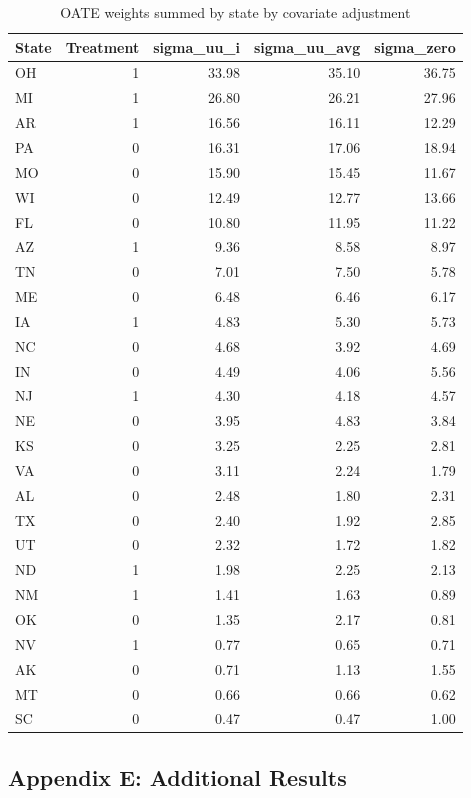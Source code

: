 \documentclass[12pt]{article}
\begin{document}
\begin{table}[ht]
\centering
\begin{tabular}{lrrrr}
  \toprule
State & Treatment & sigma\_uu\_i & sigma\_uu\_avg & sigma\_zero \\ 
  \midrule
OH & 1 & 33.98 & 35.10 & 36.75 \\ 
  MI & 1 & 26.80 & 26.21 & 27.96 \\ 
  AR & 1 & 16.56 & 16.11 & 12.29 \\ 
  PA & 0 & 16.31 & 17.06 & 18.94 \\ 
  MO & 0 & 15.90 & 15.45 & 11.67 \\ 
  WI & 0 & 12.49 & 12.77 & 13.66 \\ 
  FL & 0 & 10.80 & 11.95 & 11.22 \\ 
  AZ & 1 & 9.36 & 8.58 & 8.97 \\ 
  TN & 0 & 7.01 & 7.50 & 5.78 \\ 
  ME & 0 & 6.48 & 6.46 & 6.17 \\ 
  IA & 1 & 4.83 & 5.30 & 5.73 \\ 
  NC & 0 & 4.68 & 3.92 & 4.69 \\ 
  IN & 0 & 4.49 & 4.06 & 5.56 \\ 
  NJ & 1 & 4.30 & 4.18 & 4.57 \\ 
  NE & 0 & 3.95 & 4.83 & 3.84 \\ 
  KS & 0 & 3.25 & 2.25 & 2.81 \\ 
  VA & 0 & 3.11 & 2.24 & 1.79 \\ 
  AL & 0 & 2.48 & 1.80 & 2.31 \\ 
  TX & 0 & 2.40 & 1.92 & 2.85 \\ 
  UT & 0 & 2.32 & 1.72 & 1.82 \\ 
  ND & 1 & 1.98 & 2.25 & 2.13 \\ 
  NM & 1 & 1.41 & 1.63 & 0.89 \\ 
  OK & 0 & 1.35 & 2.17 & 0.81 \\ 
  NV & 1 & 0.77 & 0.65 & 0.71 \\ 
  AK & 0 & 0.71 & 1.13 & 1.55 \\ 
  MT & 0 & 0.66 & 0.66 & 0.62 \\ 
  SC & 0 & 0.47 & 0.47 & 1.00 \\ 
  \bottomrule
\end{tabular}
\caption{OATE weights summed by state by covariate adjustment}
\label{tab:oatestateweights}
\end{table}

\subsection{Appendix E: Additional Results}
\end{document}
